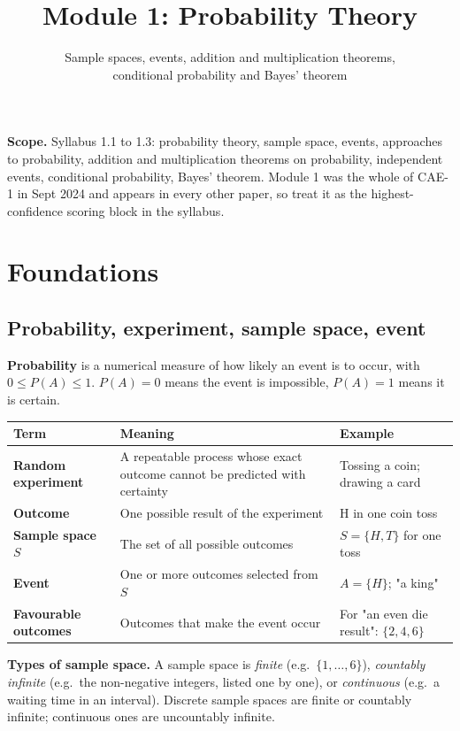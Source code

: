 \documentclass[11pt,a4paper]{article}
\title{\textbf{Module 1: Probability Theory}\\}
\author{\large Sample spaces, events, addition and multiplication theorems,\\conditional probability and Bayes' theorem}
\date{}
\begin{document}
\maketitle

\begin{exambox}
\textbf{Scope.} Syllabus 1.1 to 1.3: probability theory, sample space, events, approaches to probability, addition and multiplication theorems on probability, independent events, conditional probability, Bayes' theorem. Module 1 was the whole of CAE-1 in Sept 2024 and appears in every other paper, so treat it as the highest-confidence scoring block in the syllabus.
\end{exambox}

\tableofcontents
\newpage

\section{Foundations}

\subsection{Probability, experiment, sample space, event}

\textbf{Probability} is a numerical measure of how likely an event is to occur, with $0\le P(A)\le 1$. $P(A)=0$ means the event is impossible, $P(A)=1$ means it is certain.

\begin{center}\small
\begin{tabularx}{\textwidth}{>{\bfseries}p{} X X}
\toprule Term & Meaning & Example\\\midrule
Random experiment & A repeatable process whose exact outcome cannot be predicted with certainty & Tossing a coin; drawing a card\\
Outcome & One possible result of the experiment & H in one coin toss\\
Sample space $S$ & The set of all possible outcomes & $S=\{H,T\}$ for one toss\\
Event & One or more outcomes selected from $S$ & $A=\{H\}$; "a king"\\
Favourable outcomes & Outcomes that make the event occur & For "an even die result": $\{2,4,6\}$\\
\end{tabularx}
\end{center}

\textbf{Types of sample space.} A sample space is \emph{finite} (e.g.\ $\{1,\dots,6\}$), \emph{countably infinite} (e.g.\ the non-negative integers, listed one by one), or \emph{continuous} (e.g.\ a waiting time in an interval). Discrete sample spaces are finite or countably infinite; continuous ones are uncountably infinite.
\end{document}
